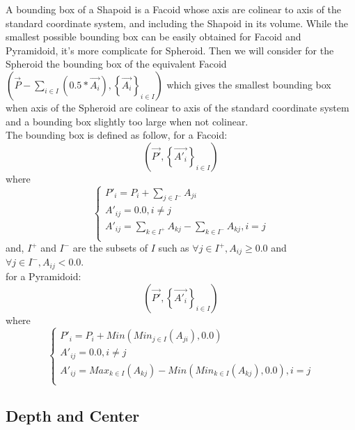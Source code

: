 \documentclass[12pt, a4paper]{article}
\begin{document}
A bounding box of a Shapoid is a Facoid whose axis are colinear to axis of the standard coordinate system, and including the Shapoid in its volume. While the smallest possible bounding box can be easily obtained for Facoid and Pyramidoid, it's more complicate for Spheroid. Then we will consider for the Spheroid the bounding box of the equivalent Facoid $\left(\overrightarrow{P}-\sum_{i\in I}\left(0.5*\overrightarrow{A_i}\right),\left\lbrace\overrightarrow{A_i}\right\rbrace_{i\in I}\right)$ which gives the smallest bounding box when axis of the Spheroid are colinear to axis of the standard coordinate system and a bounding box slightly too large when not colinear.\\
The bounding box is defined as follow, for a Facoid:\\
\begin{equation}
\left(\overrightarrow{P'},\left\lbrace\overrightarrow{A'_i}\right\rbrace_{i\in I}\right)
\end{equation}
where\\
\begin{equation}
\left\lbrace
\begin{array}{l}
P'_i=P_i+\sum_{j\in I^-}A_{ji}\\
A'_{ij}=0.0,i\neq j\\
A'_{ij}=\sum_{k\in I^+}A_{kj}-\sum_{k\in I^-}A_{kj},i=j\\
\end{array}
\right.
\end{equation}
and, $I^+$ and $I^-$ are the subsets of $I$ such as $\forall j\in I^+,A_{ij}\ge 0.0$ and $\forall j\in I^-,A_{ij}<0.0$.\\

for a Pyramidoid:\\
\begin{equation}
\left(\overrightarrow{P'},\left\lbrace\overrightarrow{A'_i}\right\rbrace_{i\in I}\right)
\end{equation}
where\\
\begin{equation}
\left\lbrace
\begin{array}{l}
P'_i=P_i+Min\left(Min_{j\in I}(A_{ji}),0.0\right)\\
A'_{ij}=0.0,i\neq j\\
A'_{ij}=Max_{k\in I}(A_{kj})-Min\left(Min_{k\in I}(A_{kj}),0.0\right),i=j\\
\end{array}
\right.
\end{equation}

\subsection{Depth and Center}
\end{document}
